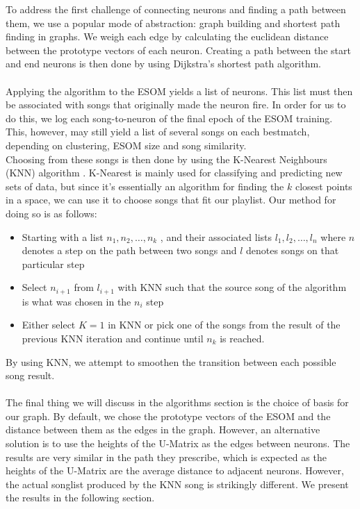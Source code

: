 To address the first challenge of connecting neurons and finding a path between them, we use a popular mode of abstraction: graph building and shortest path finding in graphs. We weigh each edge by calculating the euclidean distance between the prototype vectors of each neuron.
Creating a path between the start and end neurons is then done by using Dijkstra's shortest path algorithm.
\\\\
Applying the algorithm to the ESOM yields a list of neurons. This list must then be associated with songs that originally made the neuron fire. In order for us to do this, we log each song-to-neuron of the final epoch of the ESOM training. This, however, may still yield a list of several songs on each bestmatch, depending on clustering, ESOM size and song similarity. \\
Choosing from these songs is then done by using the K-Nearest Neighbours (KNN) algorithm \citep{han12}. K-Nearest is mainly used for classifying and predicting new sets of data, but since it's essentially an algorithm for finding the $k$ closest points in a space, we can use it to choose songs that fit our playlist. Our method for doing so is as follows:

\begin{itemize}
\item Starting with a list $ n_1, n_2, \dots, n_k $ , and their associated lists $ l_1, l_2, \dots, l_n $ where $n$ denotes a step on the path between two songs and $l$ denotes songs on that particular step
\item Select $ n_{i+1} $ from $ l_{i+1} $ with KNN such that the source song of the algorithm is what was chosen in the $ n_{i} $ step
\item Either select $K = 1$ in KNN or pick one of the songs from the result of the previous KNN iteration and continue until $n_k$ is reached.
\end{itemize}

\noindent
By using KNN, we attempt to smoothen the transition between each possible song result. \\\\
The final thing we will discuss in the algorithms section is the choice of basis for our graph. By default, we chose 
the prototype vectors of the ESOM and the distance between them as the edges in the graph. However, an alternative solution is to use the heights of the U-Matrix as the edges between neurons. The results are very similar in the path they prescribe, which is expected as the heights of the U-Matrix are the average distance to adjacent neurons. However, the actual songlist produced by the KNN song is strikingly different. We present the results in the following section.

